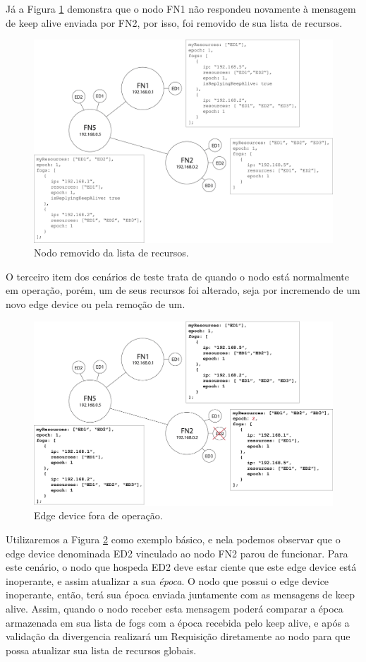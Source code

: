 Já a Figura \ref{fig:fig9} demonstra que o nodo FN1 não respondeu novamente à mensagem de keep alive enviada por FN2, por isso, foi removido de sua lista de recursos. 

\begin{figure}[h!]
    \centering\includegraphics[width=.8\textwidth]{fig9.png}
    \caption%
    {\label{fig:fig9} Nodo removido da lista de recursos.}
\end{figure}

O terceiro item dos cenários de teste trata de quando o nodo está normalmente em operação, porém, um de seus recursos foi alterado, seja por incremendo de um novo edge device ou
pela remoção de um.

\begin{figure}[H]
    \centering\includegraphics[width=.8\textwidth]{fig10.png} 
    \caption%
    {\label{fig:fig10} Edge device fora de operação.}
\end{figure}

Utilizaremos a Figura \ref{fig:fig10} como exemplo básico, e nela podemos observar que o edge device denominada ED2 vinculado ao nodo FN2 parou de funcionar.
Para este cenário, o nodo que hospeda ED2 deve estar ciente que este edge device está inoperante, e assim atualizar a sua \textit{época}.
O nodo que possui o edge device inoperante, então, terá sua época enviada juntamente com as mensagens de keep alive.
Assim, quando o nodo receber esta mensagem poderá comparar a época armazenada em sua lista de fogs com a época recebida pelo keep alive, e após a validação da divergencia realizará
um Requisição diretamente ao nodo para que possa atualizar sua lista de recursos globais.

